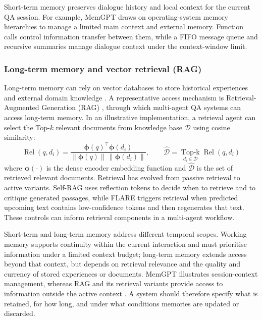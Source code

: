\documentclass[a4paper,fleqn]{cas-dc}
\begin{document}
Short-term memory preserves dialogue history and local context for the
current QA session. For example, MemGPT \citep{packer2023memgpt} draws on
operating-system memory hierarchies to manage a limited main context and
external memory. Function calls control information transfer between them,
while a FIFO message queue and recursive summaries manage dialogue context
under the context-window limit.

\subsubsection{Long-term memory and vector retrieval (RAG)}
\label{sec:long_mem}

Long-term memory can rely on vector databases to store historical
experiences and external domain knowledge \citep{zhang2024memory_survey}.
A representative access mechanism is Retrieval-Augmented Generation (RAG)
\citep{lewis2020rag,gao2024rag_survey}, through which multi-agent QA systems
can access long-term memory. In an illustrative implementation, a retrieval
agent can select the Top-$k$ relevant documents from knowledge base $\mathcal{D}$
using cosine similarity:
\begin{equation}
  \operatorname{Rel}(q,d_i) =
  \frac{\boldsymbol{\phi}(q)^{\top}\boldsymbol{\phi}(d_i)}
       {\|\boldsymbol{\phi}(q)\|\,\|\boldsymbol{\phi}(d_i)\|},\qquad
  \hat{\mathcal{D}} =
  \operatorname*{Top\text{-}k}_{d_i\in\mathcal{D}}\operatorname{Rel}(q,d_i)
  \label{eq:rag}
\end{equation}
where $\boldsymbol{\phi}(\cdot)$ is the dense encoder embedding function and
$\hat{\mathcal{D}}$ is the set of retrieved relevant documents. Retrieval has
evolved from passive retrieval to active variants. Self-RAG
\citep{asai2024selfrag} uses reflection tokens to decide when to retrieve and
to critique generated passages, while FLARE \citep{jiang2023active_rag}
triggers retrieval when predicted upcoming text contains low-confidence
tokens and then regenerates that text. These controls can inform retrieval
components in a multi-agent workflow.

Short-term and long-term memory address
different temporal scopes. Working memory supports continuity within the
current interaction and must prioritise information under a limited context
budget; long-term memory extends access beyond that context, but depends on
retrieval relevance and the quality and currency of stored experiences or
documents. MemGPT illustrates session-context management, whereas RAG and its
retrieval variants provide access to information outside the active context
\citep{packer2023memgpt,lewis2020rag,gao2024rag_survey,asai2024selfrag,
jiang2023active_rag}. A system should therefore specify what is retained, for
how long, and under what conditions memories are updated or discarded.
\end{document}
